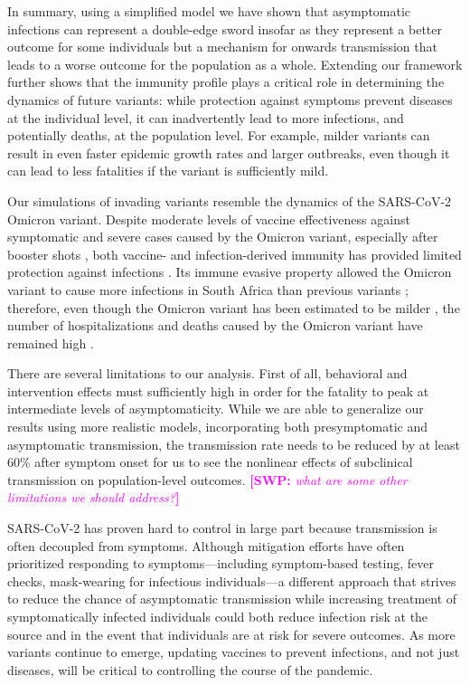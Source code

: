 \documentclass[12pt]{article}
\newcommand{\comment}{\showcomment}
\newcommand{\showcomment}[3]{\textcolor{#1}{\textbf{[#2: }\textsl{#3}\textbf{]}}}
\newcommand{\swp}[1]{\comment{magenta}{SWP}{#1}}
\begin{document}
In summary, using a simplified model we have shown that asymptomatic infections can represent a double-edge sword insofar as they represent a better outcome for some individuals but a mechanism for onwards transmission that leads to a worse outcome for the population as a whole.
Extending our framework further shows that the immunity profile plays a critical role in determining the dynamics of future variants:
while protection against symptoms prevent diseases at the individual level, it can inadvertently lead to more infections, and potentially deaths, at the population level.
For example, milder variants can result in even faster epidemic growth rates and larger outbreaks, even though it can lead to less fatalities if the variant is sufficiently mild.

Our simulations of invading variants resemble the dynamics of the SARS-CoV-2 Omicron variant.
Despite moderate levels of vaccine effectiveness against symptomatic and severe cases caused by the Omicron variant, especially after booster shots \citep{andres2022omicron}, both vaccine- and infection-derived immunity has provided limited protection against infections \citep{pearson2021omicron}.
Its immune evasive property allowed the Omicron variant to cause more infections in South Africa than previous variants \citep{sun2022omicron};
therefore, even though the Omicron variant has been estimated to be milder \citep{MENNI20221618,ulloa2022estimates}, the number of hospitalizations and deaths caused by the Omicron variant have remained high \citep{Iacobuccio254,faust2022omicron,sigal2022estimating}.

There are several limitations to our analysis.
First of all, behavioral and intervention effects must sufficiently high in order for the fatality to peak at intermediate levels of asymptomaticity.
While we are able to generalize our results using more realistic models, incorporating both presymptomatic and asymptomatic transmission, the transmission rate needs to be reduced by at least 60\% after symptom onset for us to see the nonlinear effects of subclinical transmission on population-level outcomes.
\swp{what are some other limitations we should address?}

SARS-CoV-2 has proven hard to control in large part because transmission is often decoupled from symptoms. 
Although mitigation efforts have often prioritized responding to symptoms---including symptom-based testing, fever checks, mask-wearing for infectious individuals---a different approach that strives to reduce the chance of asymptomatic transmission while increasing treatment of symptomatically infected individuals could both reduce infection risk at the source and in the event that individuals are at risk for severe outcomes.
As more variants continue to emerge, updating vaccines to prevent infections, and not just diseases, will be critical to controlling the course of the pandemic.
\end{document}

